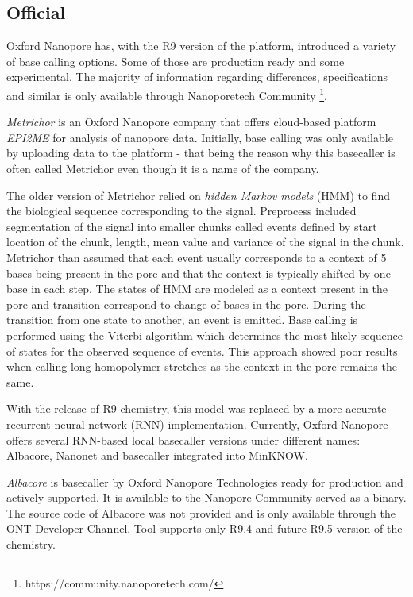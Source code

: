 \documentclass[times, utf8, diplomski, numeric, english]{fer}
\begin{document}
\subsection{Official}
Oxford Nanopore has, with the R9 version of the platform, introduced a variety of base calling options. Some of those are production ready and some experimental. The majority of information regarding differences, specifications and similar is only available through Nanoporetech Community \footnote{https://community.nanoporetech.com/}.


\textit{Metrichor} is an Oxford Nanopore company that offers cloud-based platform \textit{EPI2ME} for analysis of nanopore data. 
Initially, base calling was only available by uploading data to the platform - that being the reason why this basecaller is often called Metrichor even though it is a name of the company.

The older version of Metrichor relied on \textit{hidden Markov models} (HMM) to find the biological sequence corresponding to the signal. Preprocess included segmentation of the signal into smaller chunks called events defined by start location of the chunk, length, mean value and variance of the signal in the chunk. Metrichor than assumed that each event usually corresponds to a context of 5 bases being present in the pore and that the context is typically shifted by one base in each step. 
The states of HMM are modeled as a context present in the pore and transition correspond to change of bases in the pore. During the transition from one state to another, an event is emitted. Base calling is performed using the Viterbi algorithm which determines the most likely sequence of states for the observed sequence of events. This approach showed poor results when calling long homopolymer stretches as the context in the pore remains the same\cite{homopolymers}.

With the release of R9 chemistry, this model was replaced by a more accurate recurrent neural network (RNN) implementation. Currently, Oxford Nanopore offers several RNN-based local basecaller versions under different names\cite{ont-basecallers}: Albacore, Nanonet and basecaller integrated into MinKNOW.  

\textit{Albacore} is basecaller by Oxford Nanopore Technologies ready for production and actively supported.
It is available to the Nanopore Community served as a binary. The source code of Albacore was not provided and is only available through the ONT Developer Channel. Tool supports only R9.4 and future R9.5 version of the chemistry.
\end{document}
